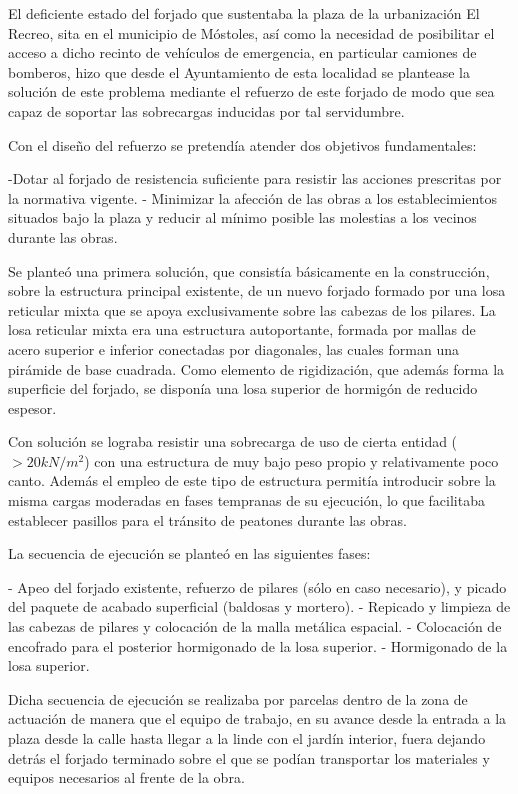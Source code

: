 

El deficiente estado del forjado que sustentaba la plaza de la urbanización El Recreo, sita en el municipio de Móstoles, así como la necesidad de posibilitar el acceso a dicho recinto de vehículos de emergencia, en particular camiones de bomberos, hizo que desde el Ayuntamiento de esta localidad se plantease la solución de este problema mediante el refuerzo de este forjado de modo que sea capaz de soportar las sobrecargas inducidas por tal servidumbre.

Con el diseño del refuerzo se pretendía atender dos objetivos fundamentales:

-Dotar al forjado de resistencia suficiente para resistir las acciones prescritas por la normativa vigente.
- Minimizar la afección de las obras a los establecimientos situados bajo la plaza y reducir al mínimo posible las molestias a los vecinos durante las obras.

Se planteó una primera solución, que consistía básicamente en la construcción, sobre la estructura principal existente, de un nuevo forjado formado por una losa reticular mixta que se apoya exclusivamente sobre las cabezas de los pilares. La losa reticular mixta era una estructura autoportante, formada por mallas de acero superior e inferior conectadas por diagonales, las cuales forman una pirámide de base cuadrada. Como elemento de rigidización, que además forma la superficie del forjado, se disponía una losa superior de hormigón de reducido espesor.

Con solución se lograba resistir una sobrecarga de uso de cierta entidad ($> 20 kN/m^2$) con una estructura de muy bajo peso propio y relativamente poco canto. Además el empleo de este tipo de estructura permitía introducir sobre la misma cargas moderadas en fases tempranas de su ejecución, lo que facilitaba establecer pasillos para el tránsito de peatones durante las obras. 

La secuencia de ejecución se planteó en las siguientes fases:

- Apeo del forjado existente, refuerzo de pilares (sólo en caso necesario), y picado del paquete de acabado superficial (baldosas y mortero).
- Repicado y limpieza de las cabezas de pilares y colocación de la malla metálica espacial.
- Colocación de encofrado para el posterior hormigonado de la losa superior.
- Hormigonado de la losa superior.


Dicha secuencia de ejecución se realizaba por parcelas dentro de la zona de actuación de manera que el equipo de trabajo, en su avance desde la entrada a la plaza desde la calle hasta llegar a la linde con el jardín interior, fuera dejando detrás el forjado terminado sobre el que se podían transportar los materiales y equipos necesarios al frente de la obra. 


